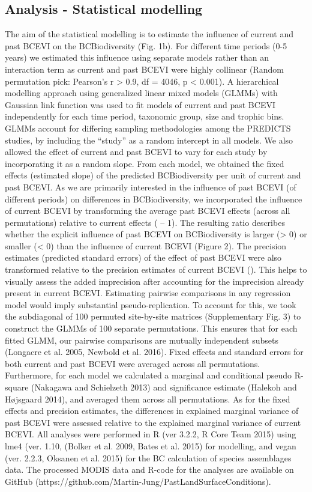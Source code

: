 \subsection{Analysis - Statistical modelling}
The aim of the statistical modelling is to estimate the influence of current and past BCEVI on the BCBiodiversity (Fig. 1b). For different time periods (0-5 years) we estimated this influence using separate models rather than an interaction term as current and past BCEVI were highly collinear (Random permutation pick: Pearson’s r > 0.9, df = 4046, p < 0.001). A hierarchical modelling approach using generalized linear mixed models (GLMMs) with Gaussian link function was used to fit models of current and past BCEVI independently for each time period, taxonomic group, size and trophic bins. GLMMs account for differing sampling methodologies among the PREDICTS studies, by including the “study” as a random intercept in all models. We also allowed the effect of current and past BCEVI to vary for each study by incorporating it as a random slope. From each model, we obtained the fixed effects (estimated slope) of the predicted BCBiodiversity per unit of current and past BCEVI.
	As we are primarily interested in the influence of past BCEVI (of different periods) on differences in BCBiodiversity, we incorporated the influence of current BCEVI by transforming the average past BCEVI effects (across all permutations) relative to current effects ( – 1). The resulting ratio describes whether the explicit influence of past BCEVI on BCBiodiversity is larger (> 0) or smaller (< 0) than the influence of current BCEVI (Figure 2). The precision estimates (predicted standard errors) of the effect of past BCEVI were also transformed relative to the precision estimates of current BCEVI (). This helps to visually assess the added imprecision after accounting for the imprecision already present in current BCEVI. 
	Estimating pairwise comparisons in any regression model would imply substantial pseudo-replication. To account for this, we took the subdiagonal of 100 permuted site-by-site matrices (Supplementary Fig. 3) to construct the GLMMs of 100 separate permutations. This ensures that for each fitted GLMM, our pairwise comparisons are mutually independent subsets (Longacre et al. 2005, Newbold et al. 2016). Fixed effects and standard errors for both current and past BCEVI were averaged across all permutations. Furthermore, for each model we calculated a marginal and conditional pseudo R-square (Nakagawa and Schielzeth 2013) and significance estimate (Halekoh and Højsgaard 2014), and averaged them across all permutations. As for the fixed effects and precision estimates, the differences in explained marginal variance of past BCEVI were assessed relative to the explained marginal variance of current BCEVI.
	All analyses were performed in R (ver 3.2.2, R Core Team 2015) using lme4 (ver. 1.10, (Bolker et al. 2009, Bates et al. 2015) for modelling, and vegan (ver. 2.2.3, Oksanen et al. 2015) for the BC calculation of species assemblages data. The processed MODIS data and R-code for the analyses are available on GitHub (https://github.com/Martin-Jung/PastLandSurfaceConditions). 

